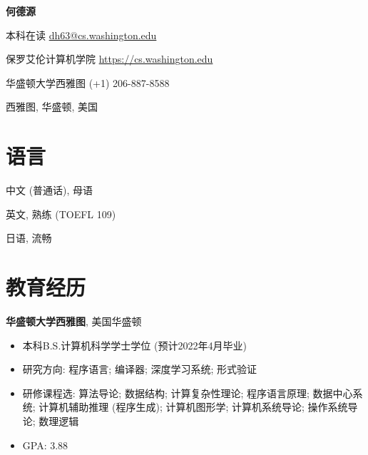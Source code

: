 \documentclass{article}
\begin{document}
\begin{center}
    \vspace*{5pt}
    \huge{
    \textbf{何德源}}
\end{center}
\vspace{15pt}




\setlength{\parskip}{1pt}

\noindent 本科在读 \hfill \href{mailto:dh63@cs.washington.edu}{dh63@cs.washington.edu}

\noindent 保罗艾伦计算机学院 \hfill \url{https://cs.washington.edu}

\noindent 华盛顿大学西雅图 \hfill (+1) 206-887-8588

\noindent 西雅图, 华盛顿, 美国

\setlength{\parskip}{3pt}

\section*{语言}
中文 (普通话), 母语

英文, 熟练 (TOEFL 109)

日语, 流畅

\section*{教育经历}
\textbf{华盛顿大学西雅图}, 美国华盛顿

\begin{itemize}
    \setlength{\itemsep}{1pt}
    \setlength{\parskip}{0pt}
    \setlength{\parsep}{0pt}
    \item 本科B.S.计算机科学学士学位 (预计2022年4月毕业)
    \item 研究方向: 程序语言; 编译器; 深度学习系统; 形式验证
    \item 研修课程选: 算法导论; 数据结构; 计算复杂性理论; 程序语言原理; 数据中心系统; 计算机辅助推理 (程序生成); 计算机图形学; 计算机系统导论; 操作系统导论; 数理逻辑
    \item GPA: 3.88
\end{itemize}





\end{document}
